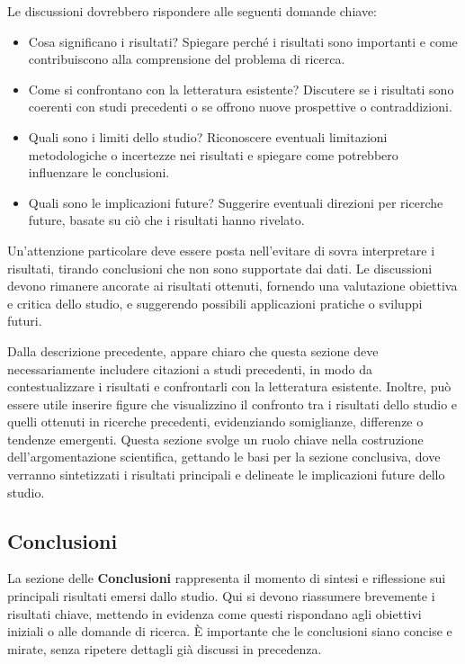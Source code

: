 \documentclass[9pt,a4paper,twoside]{rho-class/rho}
\begin{document}
Le discussioni dovrebbero rispondere alle seguenti domande chiave:
\begin{itemize}
	\item Cosa significano i risultati? Spiegare perché i risultati sono importanti e come contribuiscono alla comprensione del problema di ricerca.
	\item Come si confrontano con la letteratura esistente? Discutere se i risultati sono coerenti con studi precedenti o se offrono nuove prospettive o contraddizioni.
	\item Quali sono i limiti dello studio? Riconoscere eventuali limitazioni metodologiche o incertezze nei risultati e spiegare come potrebbero influenzare le conclusioni.
	\item Quali sono le implicazioni future? Suggerire eventuali direzioni per ricerche future, basate su ciò che i risultati hanno rivelato.
\end{itemize}

Un’attenzione particolare deve essere posta nell’evitare di sovra interpretare i risultati, tirando conclusioni che non sono supportate dai dati. Le discussioni devono rimanere ancorate ai risultati ottenuti, fornendo una valutazione obiettiva e critica dello studio, e suggerendo possibili applicazioni pratiche o sviluppi futuri.

Dalla descrizione precedente, appare chiaro che questa sezione deve necessariamente includere citazioni a studi precedenti, in modo da contestualizzare i risultati e confrontarli con la letteratura esistente. Inoltre, può essere utile inserire figure che visualizzino il confronto tra i risultati dello studio e quelli ottenuti in ricerche precedenti, evidenziando somiglianze, differenze o tendenze emergenti. Questa sezione svolge un ruolo chiave nella costruzione dell’argomentazione scientifica, gettando le basi per la sezione conclusiva, dove verranno sintetizzati i risultati principali e delineate le implicazioni future dello studio.

\subsection{Conclusioni}
La sezione delle \textbf{Conclusioni} rappresenta il momento di sintesi e riflessione sui principali risultati emersi dallo studio. Qui si devono riassumere brevemente i risultati chiave, mettendo in evidenza come questi rispondano agli obiettivi iniziali o alle domande di ricerca. È importante che le conclusioni siano concise e mirate, senza ripetere dettagli già discussi in precedenza.
\end{document}
